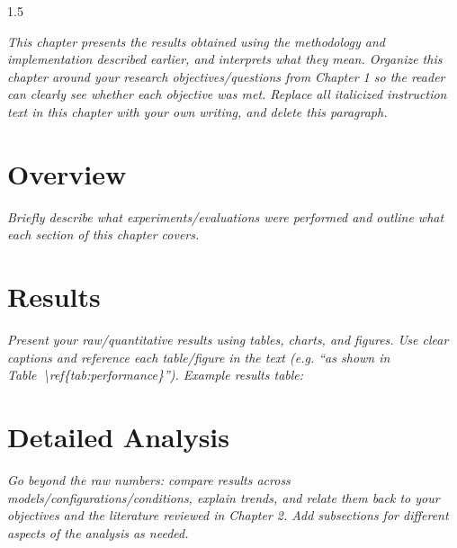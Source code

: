 \begin{spacing}{1.5}
\vspace{1cm}

\textit{This chapter presents the results obtained using the methodology and implementation described earlier, and interprets what they mean. Organize this chapter around your research objectives/questions from Chapter 1 so the reader can clearly see whether each objective was met. Replace all italicized instruction text in this chapter with your own writing, and delete this paragraph.}

\section{Overview}

\textit{Briefly describe what experiments/evaluations were performed and outline what each section of this chapter covers.}

\section{Results}

\textit{Present your raw/quantitative results using tables, charts, and figures. Use clear captions and reference each table/figure in the text (e.g. ``as shown in Table~\textbackslash ref\{tab:performance\}''). Example results table:}


\section{Detailed Analysis}

\textit{Go beyond the raw numbers: compare results across models/configurations/conditions, explain trends, and relate them back to your objectives and the literature reviewed in Chapter 2. Add subsections for different aspects of the analysis as needed.}


\end{spacing}
